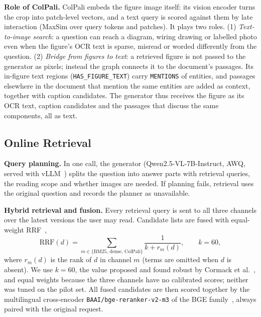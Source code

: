 \documentclass[runningheads]{llncs}
\begin{document}
\textbf{Role of ColPali.} ColPali embeds the figure image itself: its vision encoder turns the crop into patch-level vectors, and a text query is scored against them by late interaction (MaxSim over query tokens and patches). It plays two roles. (1) \emph{Text-to-image search}: a question can reach a diagram, wiring drawing or labelled photo even when the figure's OCR text is sparse, misread or worded differently from the question. (2) \emph{Bridge from figures to text}: a retrieved figure is not passed to the generator as pixels; instead the graph connects it to the document's passages. Its in-figure text regions (\texttt{HAS\_FIGURE\_TEXT}) carry \texttt{MENTIONS} of entities, and passages elsewhere in the document that mention the same entities are added as context, together with caption candidates. The generator thus receives the figure as its OCR text, caption candidates and the passages that discuss the same components, all as text.

\subsection{Online Retrieval}
\textbf{Query planning.} In one call, the generator (Qwen2.5-VL-7B-Instruct, AWQ, served with vLLM~\cite{bai2025qwen25vl,kwon2023vllm}) splits the question into answer parts with retrieval queries, the reading scope and whether images are needed. If planning fails, retrieval uses the original question and records the planner as unavailable.

\textbf{Hybrid retrieval and fusion.} Every retrieval query is sent to all three channels over the latest versions the user may read. Candidate lists are fused with equal-weight RRF~\cite{cormack2009rrf},
\begin{equation}
\mathrm{RRF}(d)=\sum_{m\in\{\mathrm{BM25},\,\mathrm{dense},\,\mathrm{ColPali}\}}\frac{1}{k+r_m(d)},\qquad k=60,
\end{equation}
where $r_m(d)$ is the rank of $d$ in channel $m$ (terms are omitted when $d$ is absent). We use $k=60$, the value proposed and found robust by Cormack et al.~\cite{cormack2009rrf}, and equal weights because the three channels have no calibrated scores; neither was tuned on the pilot set. All fused candidates are then scored together by the multilingual cross-encoder \texttt{BAAI/bge-reranker-v2-m3} of the BGE family~\cite{chen2024bgem3}, always paired with the original request.
\end{document}
